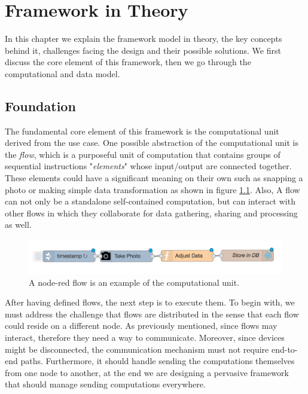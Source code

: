 
\chapter{Framework in Theory}\label{chapter:Foundation}
In this chapter we explain the framework model in theory, the key concepts behind it, challenges facing the design and their possible solutions. We first discuss the core element of this framework, then we go through the computational and data model.


\section{Foundation}
	The fundamental core element of this framework is the computational unit derived from the use case. One possible abstraction of the computational unit is the \textit{flow}, which is a purposeful unit of computation that contains groups of sequential instructions "\textit{elements}" whose input/output are connected together. These elements could have a significant meaning on their own such as snapping a photo or making simple data transformation as shown in figure \ref{fig:flow}. Also, A flow can not only be a standalone self-contained computation, but can interact with other flows in which they collaborate for data gathering, sharing and processing as well.
	
	
\begin{figure}[H]
	\centering
	\includegraphics[scale=0.5]{images/db-out.png} 
	\caption{A node-red flow is an example of the computational unit.}
	\label{fig:flow}
\end{figure}

\noindent After having defined flows, the next step is to execute them. To begin with, we must address the challenge that flows are distributed in the sense that each flow could reside on a different node. As previously mentioned,  since flows may interact, therefore they need a way to communicate. Moreover, since devices might be disconnected,  the communication mechanism must not require end-to-end paths. Furthermore, it  should handle sending the computations themselves from one node to another, at the end we are designing a pervasive framework that should manage sending computations everywhere.\\

